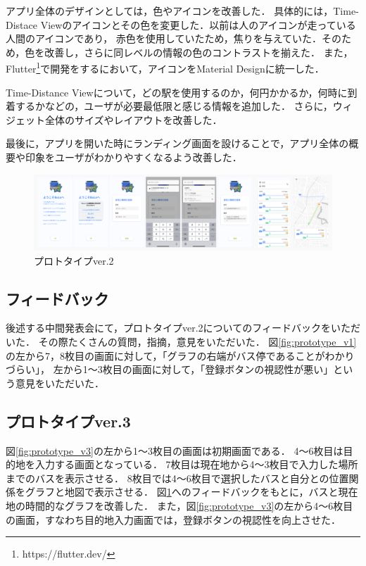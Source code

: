 アプリ全体のデザインとしては，色やアイコンを改善した．
具体的には，Time-Distace Viewのアイコンとその色を変更した．以前は人のアイコンが走っている人間のアイコンであり，
赤色を使用していたため，焦りを与えていた．そのため，色を改善し，さらに同レベルの情報の色のコントラストを揃えた．
また，Flutter\footnote{https://flutter.dev/}で開発をするにおいて，アイコンをMaterial Designに統一した．

Time-Distance Viewについて，どの駅を使用するのか，何円かかるか，何時に到着するかなどの，ユーザが必要最低限と感じる情報を追加した．
さらに，ウィジェット全体のサイズやレイアウトを改善した．

最後に，アプリを開いた時にランディング画面を設けることで，アプリ全体の概要や印象をユーザがわかりやすくなるよう改善した．

\begin{figure}[H]
    \centering
    \includegraphics[width=14cm]{images/prototype_v3.png}
    \caption{プロトタイプver.2}
    \label{fig:prototype_v2}
\end{figure}

\subsection{フィードバック}
後述する中間発表会にて，プロトタイプver.2についてのフィードバックをいただいた．
その際たくさんの質問，指摘，意見をいただいた．
図\ref{fig:prototype_v1}の左から7，8枚目の画面に対して，「グラフの右端がバス停であることがわかりづらい」，
左から1〜3枚目の画面に対して，「登録ボタンの視認性が悪い」という意見をいただいた．

\subsection{プロトタイプver.3}
図\ref{fig:prototype_v3}の左から1〜3枚目の画面は初期画面である．
4〜6枚目は目的地を入力する画面となっている．
7枚目は現在地から4〜3枚目で入力した場所までのバスを表示させる．
8枚目では4〜6枚目で選択したバスと自分との位置関係をグラフと地図で表示させる．
図\ref{fig:prototype_v2}へのフィードバックをもとに，バスと現在地の時間的なグラフを改善した．
また，図\ref{fig:prototype_v3}の左から4〜6枚目の画面，すなわち目的地入力画面では，登録ボタンの視認性を向上させた．

